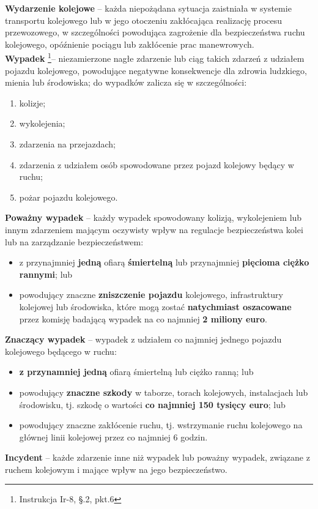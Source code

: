 \textbf{Wydarzenie kolejowe} – każda niepożądana sytuacja zaistniała w systemie transportu kolejowego lub w jego otoczeniu zakłócająca realizację procesu przewozowego, w szczególności powodująca zagrożenie dla bezpieczeństwa ruchu kolejowego, opóźnienie pociągu lub zakłócenie prac manewrowych.
\\
\textbf{Wypadek} \footnote{Instrukcja Ir-8, \S.2, pkt.6}– niezamierzone nagłe zdarzenie lub ciąg takich zdarzeń z udziałem pojazdu kolejowego, powodujące negatywne konsekwencje dla zdrowia ludzkiego, mienia lub środowiska; 
do wypadków zalicza się w szczególności:
\begin{enumerate}
	\item kolizje;
	\item wykolejenia;
	\item zdarzenia na przejazdach;
	\item zdarzenia z udziałem osób spowodowane przez pojazd kolejowy będący w ruchu;
	\item pożar pojazdu kolejowego.
\end{enumerate}
\textbf{Poważny wypadek} – każdy wypadek spowodowany kolizją, wykolejeniem lub innym
zdarzeniem mającym oczywisty wpływ na regulacje bezpieczeństwa kolei lub na
zarządzanie bezpieczeństwem:
\begin{itemize}
	\item z przynajmniej \textbf{jedną} ofiarą \textbf{śmiertelną} lub przynajmniej \textbf{pięcioma ciężko rannymi};
	lub
	\item powodujący znaczne \textbf{zniszczenie pojazdu} kolejowego, infrastruktury kolejowej lub środowiska, które mogą zostać \textbf{natychmiast oszacowane} przez komisję badającą wypadek na co najmniej \textbf{2 miliony euro}.
\end{itemize}
\textbf{Znaczący wypadek} – wypadek z udziałem co najmniej jednego pojazdu kolejowego
będącego w ruchu:
\begin{itemize}
\item \textbf{z przynamniej jedną} ofiarą śmiertelną lub ciężko ranną;
lub
\item powodujący \textbf{znaczne szkody} w taborze, torach kolejowych, instalacjach lub
środowisku, tj. szkodę o wartości \textbf{co najmniej 150 tysięcy euro};
lub
\item powodujący znaczne zakłócenie ruchu, tj. wstrzymanie ruchu kolejowego na głównej linii kolejowej przez co najmniej 6 godzin.
\end{itemize}

\textbf{Incydent} – każde zdarzenie inne niż wypadek lub poważny wypadek, związane z ruchem kolejowym i mające wpływ na jego bezpieczeństwo.

